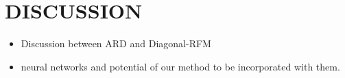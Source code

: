 \section{DISCUSSION}

\begin{itemize}
    \item Discussion between ARD and Diagonal-RFM
    \item neural networks and potential of our method to be incorporated with them.
\end{itemize}